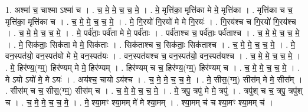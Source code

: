 \documentclass[17pt]{extarticle}
\begin{document}
1. अश्मा॑ च॒ चाश्मा ऽश्मा॑ च । . च॒ मे॒ मे॒ च॒ च॒ मे॒ । . मे॒ मृत्ति॑का॒ मृत्ति॑का मे मे॒ मृत्ति॑का । . मृत्ति॑का च च॒ मृत्ति॑का॒ मृत्ति॑का च । . च॒ मे॒ मे॒ च॒ च॒ मे॒ । . मे॒ गि॒रयो॑ गि॒रयो॑ मे मे गि॒रयः॑ । . गि॒रय॑श्च च गि॒रयो॑ गि॒रय॑श्च । . च॒ मे॒ मे॒ च॒ च॒ मे॒ । . मे॒ पर्व॑ताः॒ पर्व॑ता मे मे॒ पर्व॑ताः । . पर्व॑ताश्च च॒ पर्व॑ताः॒ पर्व॑ताश्च । . च॒ मे॒ मे॒ च॒ च॒ मे॒ । . मे॒ सिक॑ताः॒ सिक॑ता मे मे॒ सिक॑ताः । . सिक॑ताश्च च॒ सिक॑ताः॒ सिक॑ताश्च । . च॒ मे॒ मे॒ च॒ च॒ मे॒ । . मे॒ वन॒स्पत॑यो॒ वन॒स्पत॑यो मे मे॒ वन॒स्पत॑यः । . वन॒स्पत॑यश्च च॒ वन॒स्पत॑यो॒ वन॒स्पत॑यश्च । . च॒ मे॒ मे॒ च॒ च॒ मे॒ । . मे॒ हिर॑ण्य॒(ग्म्॒) हिर॑ण्यम् मे मे॒ हिर॑ण्यम् । . हिर॑ण्यम् च च॒ हिर॑ण्य॒(ग्म्॒) हिर॑ण्यम् च । . च॒ मे॒ मे॒ च॒ च॒ मे॒ । . मे ऽयो ऽयो॑ मे॒ मे ऽयः॑ । . अय॑श्च॒ चायो ऽय॑श्च । . च॒ मे॒ मे॒ च॒ च॒ मे॒ । . मे॒ सीस॒(ग्म्॒) सीस॑म् मे मे॒ सीस᳚म् । . सीस॑म् च च॒ सीस॒(ग्म्॒) सीस॑म् च । . च॒ मे॒ मे॒ च॒ च॒ मे॒ । . मे॒ त्रपु॒ त्रपु॑ मे मे॒ त्रपु॑ । . त्रपु॑श् च च॒ त्रपु॒ त्रपु॑श् च । . च॒ मे॒ मे॒ च॒ च॒ मे॒ । . मे॒ श्या॒मꣳ श्या॒मम् मे॑ मे श्या॒मम् । . श्या॒मम् च॑ च श्या॒मꣳ श्या॒मम् च॑ । \newline
\end{document}
